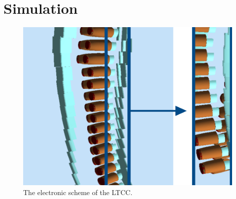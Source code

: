 \section{Simulation}


\begin{figure}
	\centering
	\includegraphics[width=0.95\columnwidth,keepaspectratio]{img/sim1.png}
	\caption{The electronic scheme of the LTCC.}
	\label{fig:sim1}
\end{figure}


